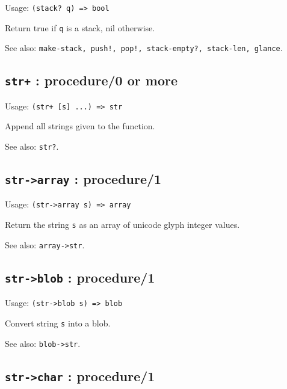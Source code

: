 \documentclass[
]{article}
\newcommand{\passthrough}[1]{#1}
\begin{document}
Usage: \passthrough{\lstinline!(stack? q) => bool!}

Return true if \passthrough{\lstinline!q!} is a stack, nil otherwise.

See also:
\passthrough{\lstinline"make-stack, push!, pop!, stack-empty?, stack-len, glance"}.

\hypertarget{str-procedure0-or-more-1}{%
\subsection{\texorpdfstring{\texttt{str+} : procedure/0 or
more}{str+ : procedure/0 or more}}\label{str-procedure0-or-more-1}}

Usage: \passthrough{\lstinline!(str+ [s] ...) => str!}

Append all strings given to the function.

See also: \passthrough{\lstinline!str?!}.

\hypertarget{str-array-procedure1-1}{%
\subsection{\texorpdfstring{\texttt{str-\textgreater{}array} :
procedure/1}{str-\textgreater array : procedure/1}}\label{str-array-procedure1-1}}

Usage: \passthrough{\lstinline!(str->array s) => array!}

Return the string \passthrough{\lstinline!s!} as an array of unicode
glyph integer values.

See also: \passthrough{\lstinline!array->str!}.

\hypertarget{str-blob-procedure1-1}{%
\subsection{\texorpdfstring{\texttt{str-\textgreater{}blob} :
procedure/1}{str-\textgreater blob : procedure/1}}\label{str-blob-procedure1-1}}

Usage: \passthrough{\lstinline!(str->blob s) => blob!}

Convert string \passthrough{\lstinline!s!} into a blob.

See also: \passthrough{\lstinline!blob->str!}.

\hypertarget{str-char-procedure1-1}{%
\subsection{\texorpdfstring{\texttt{str-\textgreater{}char} :
procedure/1}{str-\textgreater char : procedure/1}}\label{str-char-procedure1-1}}
\end{document}
